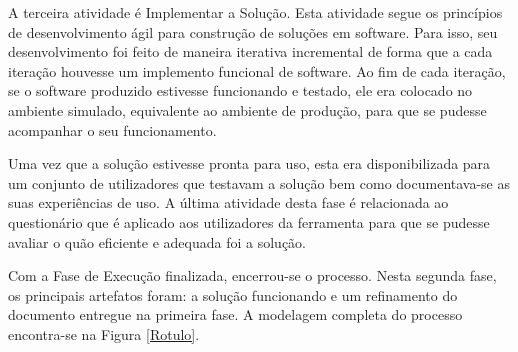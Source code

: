 A terceira atividade é Implementar a Solução. Esta atividade segue os princípios de desenvolvimento ágil para construção de soluções em software. Para isso, seu desenvolvimento foi feito de maneira iterativa incremental de forma que a cada iteração houvesse um implemento funcional de software. Ao fim de cada iteração, se o software produzido estivesse funcionando e testado, ele era colocado no ambiente simulado, equivalente ao ambiente de produção, para que se pudesse acompanhar o seu funcionamento.

Uma vez que a solução estivesse pronta para uso,  esta era disponibilizada para um conjunto de utilizadores que testavam a solução bem como documentava-se as suas experiências de uso. A última atividade desta fase é relacionada ao questionário que é aplicado aos utilizadores da ferramenta para que se pudesse avaliar o quão eficiente e adequada foi a solução. 

Com a Fase de Execução finalizada, encerrou-se o processo. Nesta segunda fase, os principais artefatos foram: a solução funcionando e um refinamento do documento entregue na primeira fase. A modelagem completa do processo encontra-se na Figura \ref{Rotulo}.

